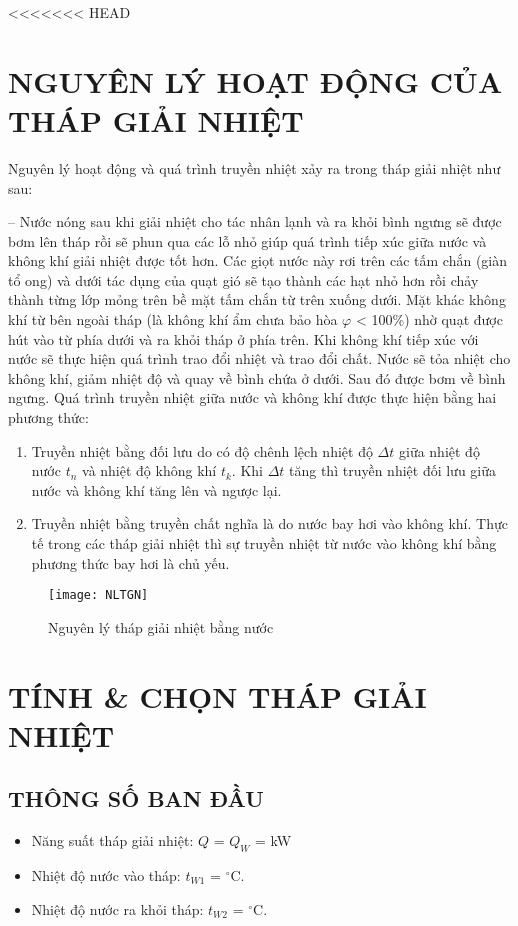 <<<<<<< HEAD
\section{NGUYÊN LÝ HOẠT ĐỘNG CỦA THÁP GIẢI NHIỆT}
Nguyên lý hoạt động và quá trình truyền nhiệt xảy ra trong tháp giải nhiệt như sau: 

\medskip
-- Nước nóng sau khi giải nhiệt cho tác nhân lạnh và ra khỏi bình ngưng sẽ được bơm lên tháp rồi sẽ phun qua các lỗ nhỏ giúp quá trình tiếp xúc giữa nước và không khí giải nhiệt được tốt hơn. Các giọt nước này rơi trên các tấm chắn (giàn tổ ong) và dưới tác dụng của quạt gió sẽ tạo thành các hạt nhỏ hơn rồi chảy thành từng lớp mỏng trên bề mặt tấm chắn từ trên xuống dưới. Mặt khác không khí từ bên ngoài tháp (là không khí ẩm chưa bảo hòa $\varphi$ < 100\%) nhờ quạt được hút vào từ phía dưới và ra khỏi tháp ở phía trên. Khi không khí tiếp xúc với nước sẽ thực hiện quá trình trao đổi nhiệt và trao đổi chất. Nước sẽ tỏa nhiệt cho không khí, giảm nhiệt độ và quay về bình chứa ở dưới. Sau đó được bơm về bình ngưng. Quá trình truyền nhiệt giữa nước và không khí được thực hiện bằng hai phương thức:
\begin{enumerate}
	\item Truyền nhiệt bằng đối lưu do có độ chênh lệch nhiệt độ $\Delta t$ giữa nhiệt độ nước $t_{n}$ và nhiệt độ không khí $t_{k}$. Khi $\Delta t$ tăng thì truyền nhiệt đối lưu giữa nước và không khí tăng lên và ngược lại.
	\item Truyền nhiệt bằng truyền chất nghĩa là do nước bay hơi vào không khí. Thực tế trong các tháp giải nhiệt thì sự truyền nhiệt từ nước vào không khí bằng phương thức bay hơi là chủ yếu.
\end{enumerate}
\begin{figure}[H]
	\centering
	\texttt{[image: NLTGN]}
	\caption{Nguyên lý tháp giải nhiệt bằng nước}
\end{figure}

\section{TÍNH \& CHỌN THÁP GIẢI NHIỆT}
\subsection{THÔNG SỐ BAN ĐẦU}
\begin{itemize}
	\item Năng suất tháp giải nhiệt: $Q$ = $Q_{W}$ = kW
	\item Nhiệt độ nước vào tháp: $ t_{W1} $ = $^{\circ}$C.
	\item Nhiệt độ nước ra khỏi tháp: $ t_{W2} $ = $^{\circ}$C.
\end{itemize}

